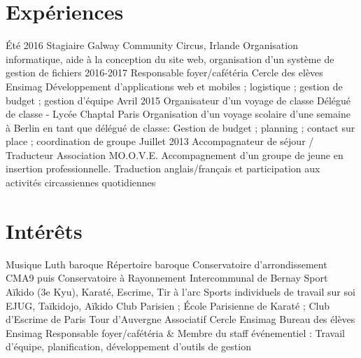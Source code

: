 \documentclass[]{friggeri-cv}
\begin{document}
\section{Expériences}
\begin{entrylist}
    \entry
        {\'Eté 2016}
        {Stagiaire}
        {Galway Community Circus, Irlande}
        {Organisation informatique, aide à la conception du site web, organisation d'un système de gestion de fichiers}
    \entry
        {2016-2017}
        {Responsable foyer/cafétéria}
        {Cercle des elèves Ensimag}
        {Développement d'applications web et mobiles ; logistique ; gestion de budget ; gestion d’équipe}
    \entry
        {Avril 2015}
        {Organisateur d'un voyage de classe}
        {Délégué de classe - Lycée Chaptal Paris}
        {Organisation d’un voyage scolaire d’une semaine à Berlin en tant que délégué de classe: Gestion de budget ; planning ; contact sur place ; coordination de groupe}
    \entry
        {Juillet 2013}
        {Accompagnateur de séjour / Traducteur}
        {Association MO.O.V.E.}
        {Accompagnement d’un groupe de jeune en insertion professionnelle. Traduction anglais/français et participation aux activités circassiennes quotidiennes}
\end{entrylist}

\section{Intérêts}
\begin{entrylist}
    \entry
        {Musique}
        {Luth baroque}
        {Répertoire baroque}
        {Conservatoire d'arrondissement CMA9 puis Conservatoire à Rayonnement Intercommunal de Bernay}
    \entry
        {Sport}
        {Aïkido (3e Kyu), Karaté, Escrime, Tir à l'arc}
        {Sports individuels de travail sur soi}
        {EJUG, Taïkidojo, Aïkido Club Parisien ; École Parisienne de Karaté ; Club d’Escrime de Paris Tour d’Auvergne}    
    \entry
        {Associatif}
        {Cercle Ensimag}
        {Bureau des élèves Ensimag}
        {Responsable foyer/cafétéria \& Membre du staff événementiel : Travail d’équipe, planification, développement d’outils de gestion}
\end{entrylist}
\end{document}
